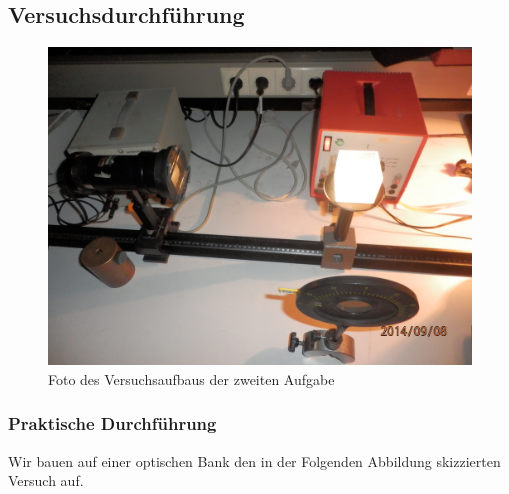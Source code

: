 \documentclass[12pt]{scrartcl}
\begin{document}
\subsection{Versuchsdurchführung}

\begin{figure}[H]
\centering
    \includegraphics[scale = 0.1]{aufgabe_2.JPG}
  	\caption[Foto des Versuchsaufbaus der zweiten Aufgabe]{Foto des Versuchsaufbaus der zweiten Aufgabe}
  \label{fig:aufgabe_2}
\end{figure}

\subsubsection{Praktische Durchführung}
Wir bauen auf einer optischen Bank den in der Folgenden Abbildung skizzierten
Versuch auf.
\end{document}

